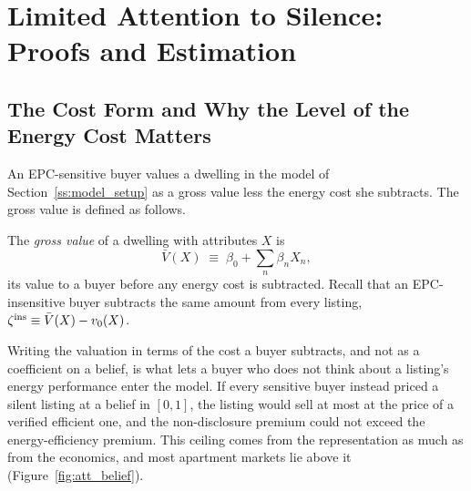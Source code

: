 
\section{Limited Attention to Silence: Proofs and Estimation}
\label{app:attention}


\subsection*{The Cost Form and Why the Level of the Energy Cost Matters}
\label{app:att_costform}

An EPC-sensitive buyer values a dwelling in the model of Section~\ref{ss:model_setup} as a gross value less the energy cost she subtracts. The gross value is defined as follows.

\begin{definition}
\label{def:cost_form}
The \emph{gross value} of a dwelling with attributes $X$ is
\begin{equation}
    \bar V(X)\;\equiv\;\beta_0+\sum_n\beta_nX_n,
    \label{eq:gross_value}
\end{equation}
its value to a buyer before any energy cost is subtracted. Recall that an EPC-insensitive buyer subtracts the same amount from every listing, $\zeta^{\rm ins}\equiv\bar V(X)-v_0(X)$.
\end{definition}

Writing the valuation in terms of the cost a buyer subtracts, and not as a coefficient on a belief, is what lets a buyer who does not think about a listing's energy performance enter the model. If every sensitive buyer instead priced a silent listing at a belief in $[0,1]$, the listing would sell at most at the price of a verified efficient one, and the non-disclosure premium could not exceed the energy-efficiency premium. This ceiling comes from the representation as much as from the economics, and most apartment markets lie above it (Figure~\ref{fig:att_belief}).

